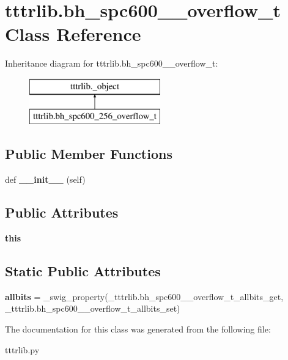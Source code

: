 \hypertarget{classtttrlib_1_1bh__spc600__256__overflow__t}{}\section{tttrlib.\+bh\+\_\+spc600\+\_\+\_\+overflow\+\_\+t Class Reference}
\label{classtttrlib_1_1bh__spc600__256__overflow__t}
Inheritance diagram for tttrlib.\+bh\+\_\+spc600\+\_\+\_\+overflow\+\_\+t\+:\begin{figure}[H]
\begin{center}
\leavevmode
\includegraphics[height=2.000000cm]{classtttrlib_1_1bh__spc600__256__overflow__t}
\end{center}
\end{figure}
\subsection*{Public Member Functions}
\begin{DoxyCompactItemize}
\item 
\mbox{\label{classtttrlib_1_1bh__spc600__256__overflow__t_abcca945d9d53ce53ba00ac9b1780ee87}} 
def {\bfseries \+\_\+\+\_\+init\+\_\+\+\_\+} (self)
\end{DoxyCompactItemize}
\subsection*{Public Attributes}
\begin{DoxyCompactItemize}
\item 
\mbox{\label{classtttrlib_1_1bh__spc600__256__overflow__t_a7c00e5d05b03ff70719bc8abe3777367}} 
{\bfseries this}
\end{DoxyCompactItemize}
\subsection*{Static Public Attributes}
\begin{DoxyCompactItemize}
\item 
\mbox{\label{classtttrlib_1_1bh__spc600__256__overflow__t_a8d339f3cf158819e29baf6c095fbf70b}} 
{\bfseries allbits} = \+\_\+swig\+\_\+property(\+\_\+tttrlib.\+bh\+\_\+spc600\+\_\+\_\+overflow\+\_\+t\+\_\+allbits\+\_\+get, \+\_\+tttrlib.\+bh\+\_\+spc600\+\_\+\_\+overflow\+\_\+t\+\_\+allbits\+\_\+set)
\end{DoxyCompactItemize}


The documentation for this class was generated from the following file\+:\begin{DoxyCompactItemize}
\item 
tttrlib.\+py\end{DoxyCompactItemize}
